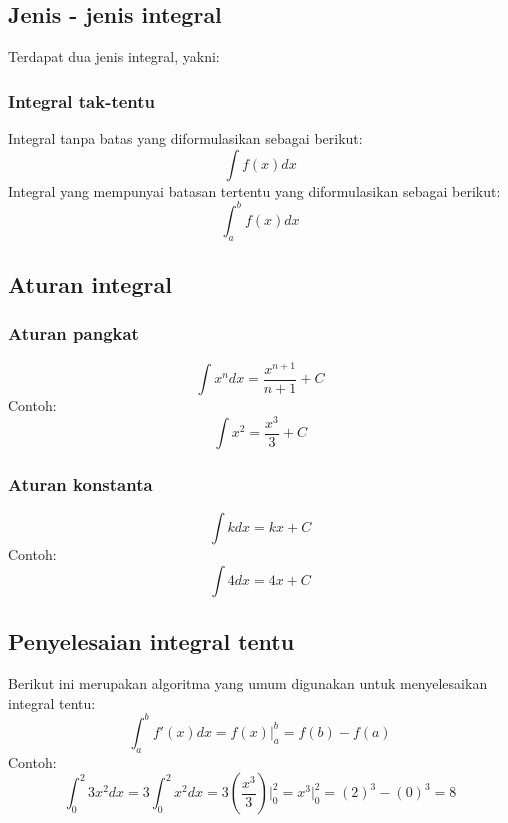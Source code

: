 \subsection{Jenis - jenis integral}
Terdapat dua jenis integral, yakni:
\subsubsection{Integral tak-tentu}
Integral tanpa batas yang diformulasikan sebagai berikut:
\begin{equation}\label{eqn:eqn28}
    \int f(x) dx
\end{equation}
Integral yang mempunyai batasan tertentu yang diformulasikan sebagai berikut:
\begin{equation}\label{eqn:eqn28}
    \int_{a}^{b} f(x) dx
\end{equation} 

\subsection{Aturan integral}
\subsubsection{Aturan pangkat}
\begin{equation}\label{eqn:eqn29}
    \int x^{n} dx = \frac{x^{n + 1}}{n + 1} + C
\end{equation}
Contoh:
\begin{equation*}
    \int x^{2} = \frac{x^3}{3} + C
\end{equation*}
\subsubsection{Aturan konstanta}
\begin{equation}\label{eqn:eqn30}
    \int k dx = kx + C
\end{equation}
Contoh:
\begin{equation*}
    \int 4 dx = 4x + C
\end{equation*}
\subsection{Penyelesaian integral tentu}
Berikut ini merupakan algoritma yang umum digunakan untuk menyelesaikan integral tentu:
\begin{dmath}\label{eqn:eqn31}
\int_{a}^{b} f'(x) dx = f(x)\big|_{a}^{b} = f(b) - f(a)
\end{dmath}
Contoh:
\begin{equation*}
\int_{0}^{2} 3x^{2} dx = 3 \int_{0}^{2} x^{2} dx = 3\left(\frac{x^3}{3}\right) \Big|_0^{2} = x^{3} \Big|_{0}^{2} = (2)^{3} - (0)^{3} = 8    
\end{equation*}
